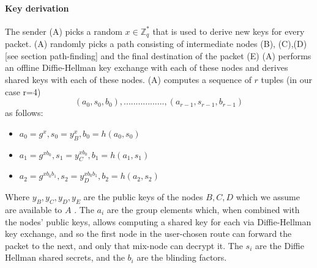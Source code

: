 \paragraph{Key derivation}
The sender (A) picks a random $x\in \mathbb{Z}^*_q$ that is used to derive new keys for every packet. 
\newline (A) randomly picks a path consisting of intermediate nodes (B), (C),(D) [see section path-finding] and the final destination of the packet (E) 
\newline (A) performs an offline Diffie-Hellman key exchange with each of these nodes and derives shared keys with each of these nodes.
\newline (A) computes a sequence of $r$ tuples (in our case r=4)  $$(a_0,s_0,b_0),.................,(a_{r-1},s_{r-1},b_{r-1})$$ as follows:
\begin{itemize}
\item $a_0=g^x,s_0=y^x_B,b_0=h(a_0,s_0)$
\item $a_1=g^{xb_0},s_1=y^{xb_0}_C,b_1=h(a_1,s_1)$
\item $a_2=g^{xb_0b_1},s_2=y^{xb_0b_1}_D,b_2=h(a_2,s_2)$
\end{itemize}
 Where $y_B,y_C,y_D,y_E$ are the public keys of the nodes $B,C, D$  which we assume are available to $A$ . The $a_i$ are the group elements which, when combined with the nodes’ public keys, allows computing a shared key for each via Diffie-Hellman key exchange, and so the first node in the user-chosen route can forward the packet to the next, and only that mix-node can decrypt it.
The $s_i$ are the Diffie Hellman shared secrets, and the $b_i$ are the blinding factors.


